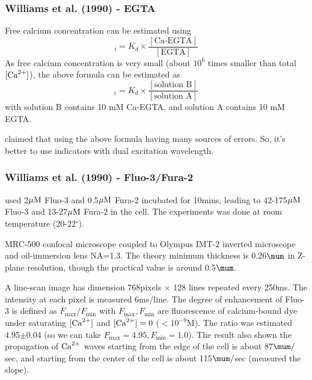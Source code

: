 \subsubsection{Williams et al. (1990) - EGTA}
\label{sec:calibrate_EGTA}

Free calcium concentration can be estimated using
\begin{equation}
[\Ca]_i = K_d \times \frac{[\text{Ca-EGTA}]}{[\text{EGTA}]}
\end{equation}
As free calcium concentration is very small (about $10^6$ times smaller than
total $[{\text{Ca}^{2+}}]$), the above formula can be estimated as
\begin{equation}
[\Ca]_i = K_d \times \frac{[\text{solution B}]}{[\text{solution A}]}
\end{equation}
with solution B contains 10 mM Ca-EGTA, and solution A contains 10 mM EGTA.

\citep{williams1990} claimed that using the above formula having many sources of
errors. So, it's better to use indicators with dual excitation wavelength.

\subsubsection{Williams et al. (1990) - Fluo-3/Fura-2}

\citep{williams1990qic} used 2${\mu\text{M}}$ Fluo-3 and 0.5${\mu\text{M}}$ Fura-2 incubated for
10mins, leading to 42-175${\mu\text{M}}$ Fluo-3 and 13-27${\mu\text{M}}$ Fura-2 in the cell. The
experiments was done at room temperature (20-22$^\circ$).

MRC-500 confocal microscope coupled to Olympus IMT-2 inverted microscope and
oil-immersion lens NA=1.3.
The theory minimum thickness is 0.26$\mum$ in Z-plane resolution, though the
practical value is around 0.5$\mum$.

A line-scan image has dimension 768pixels $\times$ 128 lines repeated every
250ms. The intensity at each pixel is measured 6ms/line. The degree of
enhancement of Fluo-3 is defined as $F_\max/F_\min$ with $F_\max, F_\min$ are
fluorescence of calcium-bound dye under saturating $[{\text{Ca}^{2+}}]$ and $[{\text{Ca}^{2+}}]=0$ ($<
10^{-9}$M). The ratio was estimated 4.95$\pm$0.04 (so we can take $F_\max=4.95,
F_\min=1.0$).
The result also shown the propagation of ${\text{Ca}^{2+}}$ waves starting from the edge of
the cell is about 87$\mum/$sec, and starting from the center of the cell is
about 115$\mum/$sec (measured the slope).

